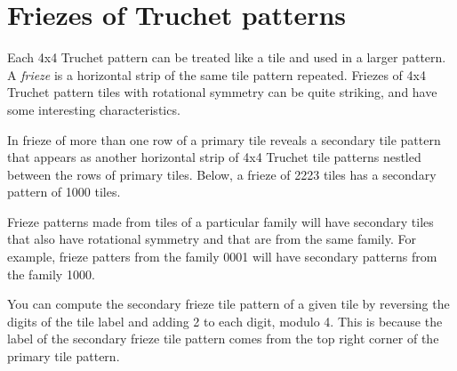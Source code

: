 \documentclass{tufte-book}
\begin{document}


% 
% 
\chapter{Friezes of Truchet patterns}

\noindent
Each 4x4 Truchet pattern can be treated like a tile and used in a larger pattern. A \textit{frieze} is a horizontal strip of the same tile pattern repeated. Friezes of 4x4 Truchet pattern tiles with rotational symmetry can be quite striking, and have some interesting characteristics. 

\vspace{0.5cm}
\noindent
In frieze of more than one row of a primary tile reveals a secondary tile pattern that appears as another horizontal strip of 4x4 Truchet tile patterns nestled between the rows of primary tiles. Below, a frieze of 2223 tiles has a secondary pattern of 1000 tiles.
\,

\vspace{0.3cm}


\vspace{0.3cm}
\noindent
Frieze patterns made from tiles of a particular family will have secondary tiles that also have rotational symmetry and that are from the same family. For example, frieze patters from the family 0001 will have secondary patterns from the family 1000. 
\marginnote{\centering} 

\vspace{0.5cm}
\noindent
You can compute the secondary frieze tile pattern of a given tile by reversing the digits of the tile label and adding 2 to each digit, modulo 4. This is because the label of the secondary frieze tile pattern comes from the top right corner of the primary tile pattern.

\newpage



\backmatter
\nocite{*}


\end{document}
